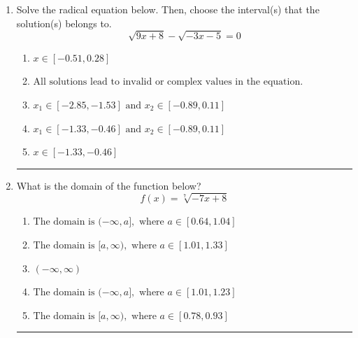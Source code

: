 \documentclass[14pt]{extbook}
\newcommand{\litem}[1]{\item#1\hspace*{-1cm}\rule{\textwidth}{0.4pt}}
\begin{document}
\begin{enumerate}
\litem{
Solve the radical equation below. Then, choose the interval(s) that the solution(s) belongs to.\[ \sqrt{9 x + 8} - \sqrt{-3 x - 5} = 0 \]\begin{enumerate}[label=\Alph*.]
\item \( x \in [-0.51,0.28] \)
\item \( \text{All solutions lead to invalid or complex values in the equation.} \)
\item \( x_1 \in [-2.85, -1.53] \text{ and } x_2 \in [-0.89,0.11] \)
\item \( x_1 \in [-1.33, -0.46] \text{ and } x_2 \in [-0.89,0.11] \)
\item \( x \in [-1.33,-0.46] \)

\end{enumerate} }
\litem{
What is the domain of the function below?\[ f(x) = \sqrt[7]{-7 x + 8} \]\begin{enumerate}[label=\Alph*.]
\item \( \text{The domain is } (-\infty, a], \text{   where } a \in [0.64, 1.04] \)
\item \( \text{The domain is } [a, \infty), \text{   where } a \in [1.01, 1.33] \)
\item \( (-\infty, \infty) \)
\item \( \text{The domain is } (-\infty, a], \text{   where } a \in [1.01, 1.23] \)
\item \( \text{The domain is } [a, \infty), \text{   where } a \in [0.78, 0.93] \)


\end{enumerate}}
\end{enumerate}
\end{document}
